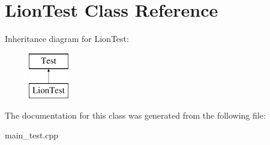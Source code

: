 \hypertarget{class_lion_test}{}\section{Lion\+Test Class Reference}
\label{class_lion_test}
Inheritance diagram for Lion\+Test\+:\begin{figure}[H]
\begin{center}
\leavevmode
\includegraphics[height=2.000000cm]{class_lion_test}
\end{center}
\end{figure}


The documentation for this class was generated from the following file\+:\begin{DoxyCompactItemize}
\item 
main\+\_\+test.\+cpp\end{DoxyCompactItemize}
